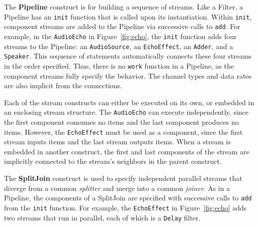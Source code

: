 The {\bf Pipeline} construct is for building a sequence of streams.
Like a Filter, a Pipeline has an {\tt init} function that is called upon
its instantiation.  Within {\tt init}, component streams are added to
the Pipeline via successive calls to {\tt add}.  For example, in the
{\tt AudioEcho} in Figure~\ref{fig:echo}, the {\tt init} function adds
four streams to the Pipeline: an {\tt AudioSource}, an {\tt EchoEffect},
an {\tt Adder}, and a {\tt Speaker}.  This sequence of statements
automatically connects these four streams in the order specified.  Thus,
there is no {\tt work} function in a Pipeline, as the component streams
fully specify the behavior.  The channel types and data rates are also
implicit from the connections.

Each of the stream constructs can either be executed on its own, or
embedded in an enclosing stream structure.  The {\tt AudioEcho} can
execute independently, since the first component consumes no items and
the last component produces no items.  However, the {\tt EchoEffect}
must be used as a component, since the first stream inputs items and the
last stream outputs items.  When a stream is embedded in another
construct, the first and last components of the stream are implicitly
connected to the stream's neighbors in the parent construct.



The {\bf SplitJoin} construct is used to specify independent parallel
streams that diverge from a common {\it splitter} and merge into a
common {\it joiner}.  As in a Pipeline, the components of a SplitJoin
are specified with successive calls to {\tt add} from the {\tt init}
function.  For example, the {\tt EchoEffect} in Figure~\ref{fig:echo}
adds two streams that run in parallel, each of which is a {\tt Delay}
filter.

